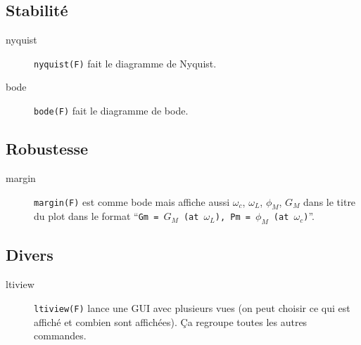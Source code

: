 \subsection{Stabilité}
\begin{description}
  \item[nyquist] \lstinline|nyquist(F)| fait le diagramme de Nyquist.
  \item[bode] \lstinline|bode(F)| fait le diagramme de bode.
\end{description}

\subsection{Robustesse}
\begin{description}
  \item[margin] \lstinline|margin(F)| est comme bode mais affiche aussi
    $\omega_c$, $\omega_L$, $\phi_M$, $G_M$ dans le titre du plot dans le format
    ``\lstinline|Gm = |$G_M$\lstinline| (at |$\omega_L$\lstinline|), Pm = |$\phi_M$\lstinline| (at |$\omega_c$\lstinline|)|''.
\end{description}

\subsection{Divers}
\begin{description}
  \item[ltiview] \lstinline|ltiview(F)| lance une GUI avec plusieurs vues
    (on peut choisir ce qui est affiché et combien sont affichées).
    Ça regroupe toutes les autres commandes.
\end{description}

\biblio



